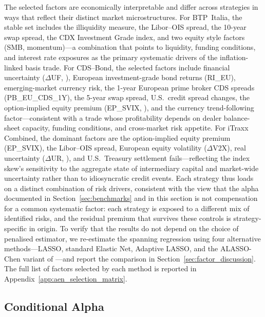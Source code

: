 The selected factors are economically interpretable and differ
across strategies in ways that reflect their distinct market
microstructures. For BTP~Italia, the stable set includes the
\citet{amihud2015pricing} illiquidity measure, the Libor--OIS
spread, the 10-year swap spread, the CDX Investment Grade index,
and two equity style factors (SMB, momentum)---a combination that
points to liquidity, funding conditions, and interest rate
exposures as the primary systematic drivers of the
inflation-linked basis trade.
For CDS--Bond, the selected factors include financial uncertainty
($\Delta$UF, \citealp{ludvigson2021uncertainty}), European
investment-grade bond returns (RI\_EU), emerging-market currency
risk, the 1-year European prime broker CDS spreads (PB\_EU\_CDS\_1Y), the 5-year swap spread,
U.S.\ credit spread changes, the option-implied equity premium
(EP\_SVIX, \citealp{martin2017expected}), and the currency
trend-following factor---consistent with a trade whose
profitability depends on dealer balance-sheet capacity, funding
conditions, and cross-market risk appetite. For iTraxx Combined,
the dominant factors are the option-implied equity premium
(EP\_SVIX), the Libor--OIS spread, European equity volatility
($\Delta$V2X), real uncertainty ($\Delta$UR,
\citealp{ludvigson2021uncertainty}), and U.S.\ Treasury settlement
fails---reflecting the index skew's sensitivity to the aggregate
state of intermediary capital and market-wide uncertainty rather
than to idiosyncratic credit events. Each strategy thus loads on a distinct combination of risk drivers,
consistent with the view that the alpha documented in Section~\ref{sec:benchmarks} and in this section is not compensation
for a common systematic factor: each strategy is exposed to a different
mix of identified risks, and the residual premium that survives these
controls is strategy-specific in origin.
To verify that the results do not depend on the choice of penalised
estimator, we re-estimate the spanning regression using four
alternative methods---LASSO, standard Elastic Net, Adaptive LASSO,
and the ALASSO-Chen variant of \citet{chen2025anomalies}---and report
the comparison in Section~\ref{sec:factor_discussion}. The full list
of factors selected by each method is reported in
Appendix~\ref{app:aen_selection_matrix}.
 
 
 
\subsection{Conditional Alpha}
\label{sec:conditional_alpha}
 
